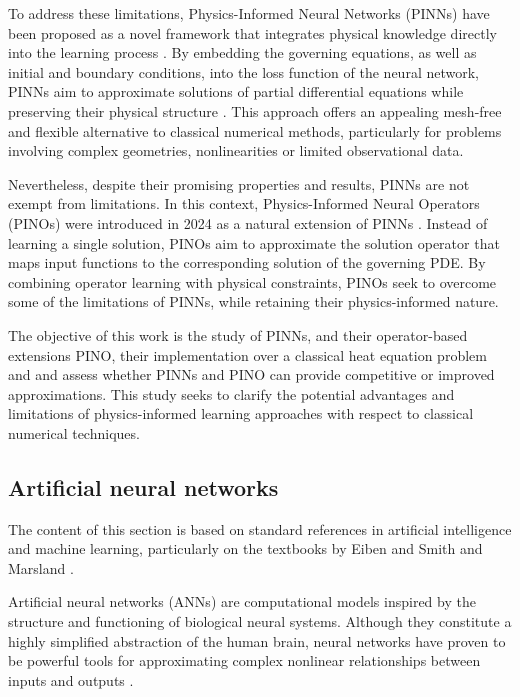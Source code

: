 \documentclass[final,1p,times]{elsarticle}
\theoremstyle{definition}
\begin{document}
To address these limitations, Physics-Informed Neural Networks (PINNs) have been proposed as a novel framework that integrates physical knowledge directly into the learning process \cite{Raissi2019PINN}. By embedding the governing equations, as well as initial and boundary conditions, into the loss function of the neural network, PINNs aim to approximate solutions of partial differential equations while preserving their physical structure \cite{Baty2024IntroPINNs}. This approach offers an appealing mesh-free and flexible alternative to classical numerical methods, particularly for problems involving complex geometries, nonlinearities or limited observational data.

Nevertheless, despite their promising properties and results, PINNs are not exempt from limitations. In this context, Physics-Informed Neural Operators (PINOs) were introduced in 2024 as a natural extension of PINNs \cite{Pino_Li}. Instead of learning a single solution, PINOs aim to approximate the solution operator that maps input functions to the corresponding solution of the governing PDE. By combining operator learning with physical constraints, PINOs seek to overcome some of the limitations of PINNs, while retaining their physics-informed nature.

The objective of this work is the study of PINNs, and their operator-based extensions PINO, their implementation over a classical heat equation problem and and assess whether PINNs and PINO can provide competitive or improved approximations. This study seeks to clarify the potential advantages and limitations of physics-informed learning approaches with respect to classical numerical techniques.

\subsection{Artificial neural networks}

The content of this section is based on standard references in artificial intelligence and machine learning, particularly on the textbooks by Eiben and Smith \cite{eiben2015introduction} and Marsland \cite{marsland2011machine}.

Artificial neural networks (ANNs) are computational models inspired by the structure and functioning of biological neural systems. Although they constitute a highly simplified abstraction of the human brain, neural networks have proven to be powerful tools for approximating complex nonlinear relationships between inputs and outputs .
\end{document}
